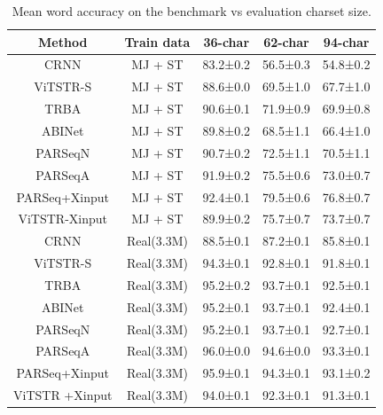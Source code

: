 \documentclass[runningheads]{llncs}
\begin{document}
\begin{table}[htbp]
\centering

    \begin{tabular}{ccccc}
    \hline
    Method         & Train data & 36-char  & 62-char  & 94-char  \\ \hline
    CRNN           & MJ + ST          & 83.2±0.2 & 56.5±0.3 & 54.8±0.2 \\
    ViTSTR-S       & MJ + ST          & 88.6±0.0 & 69.5±1.0 & 67.7±1.0 \\
    TRBA           & MJ + ST          & 90.6±0.1 & 71.9±0.9 & 69.9±0.8 \\
    ABINet         & MJ + ST          & 89.8±0.2 & 68.5±1.1 & 66.4±1.0 \\
    PARSeqN        & MJ + ST          & 90.7±0.2 & 72.5±1.1 & 70.5±1.1 \\
    PARSeqA        & MJ + ST          & 91.9±0.2 & 75.5±0.6 & 73.0±0.7 \\ \hline
    PARSeq+Xinput  & MJ + ST          & 92.4±0.1 & 79.5±0.6 & 76.8±0.7 \\
    ViTSTR-Xinput  & MJ + ST          & 89.9±0.2 & 75.7±0.7 & 73.7±0.7 \\ \hline
    CRNN           & Real(3.3M)          & 88.5±0.1 & 87.2±0.1 & 85.8±0.1 \\
    ViTSTR-S       & Real(3.3M)          & 94.3±0.1 & 92.8±0.1 & 91.8±0.1 \\
    TRBA           & Real(3.3M)          & 95.2±0.2 & 93.7±0.1 & 92.5±0.1 \\
    ABINet         & Real(3.3M)          & 95.2±0.1 & 93.7±0.1 & 92.4±0.1 \\
    PARSeqN        & Real(3.3M)          & 95.2±0.1 & 93.7±0.1 & 92.7±0.1 \\
    PARSeqA        & Real(3.3M)          & 96.0±0.0 & 94.6±0.0 & 93.3±0.1 \\ \hline
    PARSeq+Xinput  & Real(3.3M)          & 95.9±0.1 & 94.3±0.1 & 93.1±0.2 \\
    ViTSTR +Xinput & Real(3.3M)          & 94.0±0.1 & 92.3±0.1 & 91.3±0.1 \\ \hline
    \end{tabular}
    \caption[short]{Mean word accuracy on the benchmark vs evaluation charset size.}\label{table:charset}

\end{table}
\end{document}
